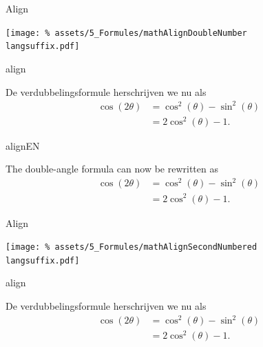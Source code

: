 \documentclass[presentatie.tex]{subfiles}
\begin{document}
\begin{frame}{Align}

	\texttt{[image: \%
		assets/5\_Formules/mathAlignDoubleNumber\\langsuffix.pdf]}
\end{frame}


\begin{saveblock}{align}
	\begin{highlightblock}[gobble=8,linewidth=\textwidth,
		framexleftmargin=0.25em,xleftmargin=0.25em]
		De verdubbelingsformule herschrijven we nu als
		\begin{align}
			\cos(2\theta) &= \cos^2(\theta) - \sin^2(\theta)
			\nonumber\\
			&= 2\cos^2(\theta)-1.
		\end{align}
	\end{highlightblock}
\end{saveblock}

\begin{saveblock}{alignEN}
	\begin{highlightblock}[gobble=8,linewidth=\textwidth,
		framexleftmargin=0.25em,xleftmargin=0.25em]
		The double-angle formula can now be rewritten as
		\begin{align}
			\cos(2\theta) &= \cos^2(\theta) - \sin^2(\theta)
			\nonumber\\
			&= 2\cos^2(\theta)-1.
		\end{align}
	\end{highlightblock}
\end{saveblock}



\begin{frame}{Align}

	\texttt{[image: \%
		assets/5\_Formules/mathAlignSecondNumbered\\langsuffix.pdf]}
\end{frame}


\begin{saveblock}{align}
	\begin{highlightblock}[gobble=8,linewidth=\textwidth,
		framexleftmargin=0.25em,xleftmargin=0.25em]
		De verdubbelingsformule herschrijven we nu als
		\begin{align*}
			\cos(2\theta) &= \cos^2(\theta) - \sin^2(\theta)\\
			&= 2\cos^2(\theta)-1.
		\end{align*}
	\end{highlightblock}
\end{saveblock}
\end{document}

